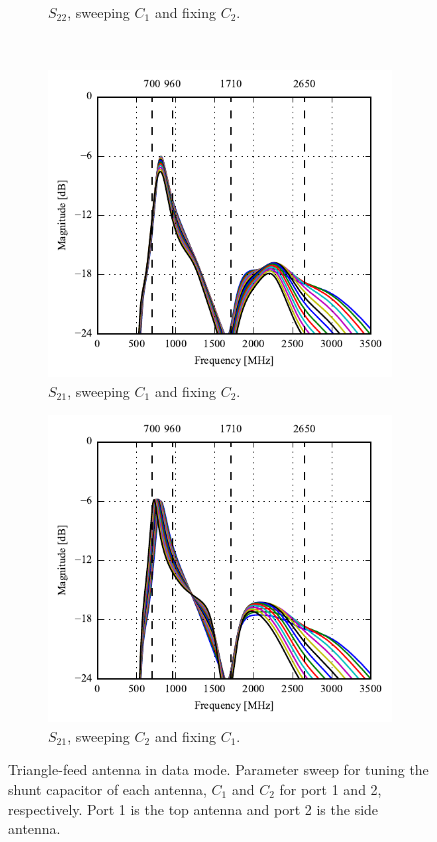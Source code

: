 \begin{figure}[htbp]
\begin{subfigure}[b]{0.49\linewidth}
        \caption{$S_{22}$, sweeping $C_1$ and fixing $C_2$.}
    \end{subfigure}
    \\
    \begin{subfigure}[b]{0.49\linewidth}
        \centering
        \includegraphics{img/tech_sol/trianglefeed/data_mode/Csh1s21.pdf}
        \caption{$S_{21}$, sweeping $C_1$ and fixing $C_2$.}
    \end{subfigure}
    \hfill
    \begin{subfigure}[b]{0.49\linewidth}
        \centering
        \includegraphics{img/tech_sol/trianglefeed/data_mode/Csh2s21.pdf}
        \caption{$S_{21}$, sweeping $C_2$ and fixing $C_1$.}
    \end{subfigure}
    \caption{Triangle-feed antenna in data mode. Parameter sweep for tuning the shunt capacitor of each antenna, $C_1$ and $C_2$ for port 1 and 2, respectively. Port 1 is the top antenna and port 2 is the side antenna.}
    \label{fig:tiang_sparam_sweep_data}
\end{figure}

